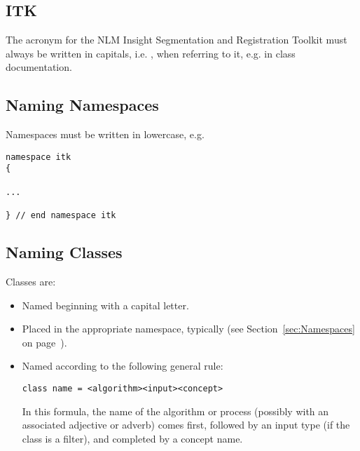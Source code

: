 \subsection{ITK}
\label{subsec:ITK}

The acronym for the NLM Insight Segmentation and Registration Toolkit must
always be written in capitals, i.e. , when referring to it, e.g. in
class documentation.


\subsection{Naming Namespaces}
\label{subsec:NamingNamespaces}

Namespaces must be written in lowercase, e.g.

\small
\begin{verbatim}
namespace itk
{

...

} // end namespace itk
\end{verbatim}
\normalsize


\subsection{Naming Classes}
\label{subsec:NamingClasses}

Classes are:
\begin{itemize}
\item Named beginning with a capital letter.
\item Placed in the appropriate namespace, typically  (see
Section~\ref{sec:Namespaces} on page~\pageref{sec:Namespaces}).
\item Named according to the following general rule:

\small
\begin{verbatim}
class name = <algorithm><input><concept>
\end{verbatim}
\normalsize

In this formula, the name of the algorithm or process (possibly with an
associated adjective or adverb) comes first, followed by an input type (if the
class is a filter), and completed by a concept name.
\end{itemize}

